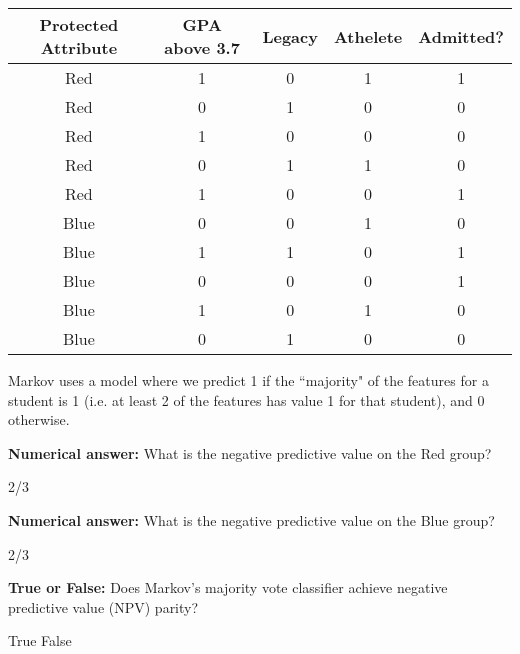 \begin{parts}
    \begin{table}[htbp]
    \centering
    \label{tab:data}
    \begin{tabular}{|c|c|c|c|c|}
        \toprule
        Protected Attribute & GPA above 3.7 & Legacy & Athelete & Admitted? \\
        \midrule
        Red & 1 & 0 & 1 & 1 \\
        Red & 0 & 1 & 0 & 0 \\
        Red & 1 & 0 & 0 & 0 \\
        Red & 0 & 1 & 1 & 0 \\
        Red & 1 & 0 & 0 & 1 \\
        \midrule
        Blue & 0 & 0 & 1 & 0 \\
        Blue & 1 & 1 & 0 & 1 \\
        Blue & 0 & 0 & 0 & 1 \\
        Blue & 1 & 0 & 1 & 0 \\
        Blue & 0 & 1 & 0 & 0 \\
        \bottomrule
    \end{tabular}
\end{table}

Markov uses a model where we predict 1 if the ``majority" of the features for a student is 1 (i.e. at least 2 of the features has value 1 for that student), and 0 otherwise.

\clearpage
\begin{subparts}
    \subpart[1] \textbf{Numerical answer:} What is the negative predictive value on the Red group?

    \begin{tcolorbox}[fit,height=1cm, width=2cm, blank, borderline={1pt}{-2pt}]
    \end{tcolorbox}
    \begin{soln}
    2/3
    \end{soln}

    \subpart[1] \textbf{Numerical answer:} What is the negative predictive value on the Blue group?
    \begin{tcolorbox}[fit,height=1cm, width=2cm, blank, borderline={1pt}{-2pt}]
    \end{tcolorbox}
    \begin{soln}
    2/3
    \end{soln}

    \subpart[1] \textbf{True or False:} Does Markov's majority vote classifier achieve negative predictive value (NPV) parity?
    \begin{checkboxes}
     \choice True 
     \choice False
    \end{checkboxes}


\end{subparts}
\end{parts}
